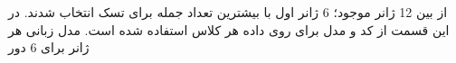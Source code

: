 \section{}
از بین 12 ژانر موجود؛ 6 ژانر اول با بیشترین تعداد جمله برای تسک 
انتخاب شدند. در این قسمت از کد
\cite{Ref1}
و مدل 
برای 
روی داده هر کلاس  استفاده شده است. مدل زبانی هر ژانر برای 6 دور 
